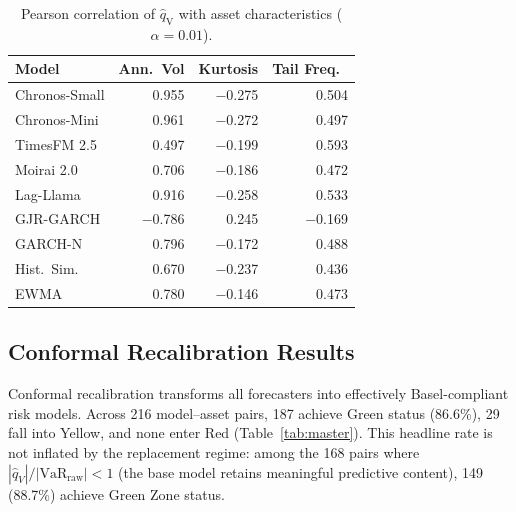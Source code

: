 \documentclass[preprint,11pt,authoryear]{elsarticle}
\newcommand{\1}{\boldsymbol{1}}
\newcommand{\qV}{\hat{q}_{\scriptscriptstyle\mathrm{V}}}
\begin{document}
	\begin{table}[H]
		\centering
		\caption{Pearson correlation of $\qV$ with asset characteristics ($\alpha = 0.01$).}
		\label{tab:cross_sectional}
		\footnotesize
		\begin{tabular}{@{}l rrr@{}}
			\toprule
			Model & Ann.\ Vol & Kurtosis & Tail Freq.\ \\
			\midrule
			Chronos-Small & 0.955 & $-$0.275 & 0.504 \\
			Chronos-Mini & 0.961 & $-$0.272 & 0.497 \\
			TimesFM 2.5 & 0.497 & $-$0.199 & 0.593 \\
			Moirai 2.0 & 0.706 & $-$0.186 & 0.472 \\
			Lag-Llama & 0.916 & $-$0.258 & 0.533 \\
			\midrule
			GJR-GARCH & $-$0.786 & 0.245 & $-$0.169 \\
			GARCH-N & 0.796 & $-$0.172 & 0.488 \\
			Hist.\ Sim. & 0.670 & $-$0.237 & 0.436 \\
			EWMA & 0.780 & $-$0.146 & 0.473 \\
			\bottomrule
		\end{tabular}
	\end{table}
	
	
	\subsection{Conformal Recalibration Results}
	\label{sec:recalib}
	
	Conformal recalibration transforms all forecasters into
	effectively Basel-compliant risk models. Across 216 model--asset
	pairs, 187 achieve Green status (86.6\%), 29 fall into Yellow,
	and none enter Red (Table~\ref{tab:master}). This headline rate
	is not inflated by the replacement regime: among the 168 pairs
	where $|\hat{q}_V|/|\mathrm{VaR}_{\mathrm{raw}}| < 1$ (the
	base model retains meaningful predictive content), 149 (88.7\%)
	achieve Green Zone status.
\end{document}
